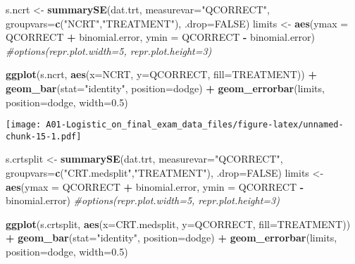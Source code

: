 \documentclass[]{article}
\newenvironment{Shaded}{\begin{snugshade}}{\end{snugshade}}
\newcommand{\KeywordTok}[1]{\textcolor[rgb]{0.13,0.29,0.53}{\textbf{#1}}}
\newcommand{\DataTypeTok}[1]{\textcolor[rgb]{0.13,0.29,0.53}{#1}}
\newcommand{\FloatTok}[1]{\textcolor[rgb]{0.00,0.00,0.81}{#1}}
\newcommand{\StringTok}[1]{\textcolor[rgb]{0.31,0.60,0.02}{#1}}
\newcommand{\CommentTok}[1]{\textcolor[rgb]{0.56,0.35,0.01}{\textit{#1}}}
\newcommand{\OtherTok}[1]{\textcolor[rgb]{0.56,0.35,0.01}{#1}}
\newcommand{\OperatorTok}[1]{\textcolor[rgb]{0.81,0.36,0.00}{\textbf{#1}}}
\newcommand{\NormalTok}[1]{#1}
\begin{document}
\begin{Shaded}
\begin{Highlighting}[]
\NormalTok{s.ncrt <-}\StringTok{ }\KeywordTok{summarySE}\NormalTok{(dat.trt, }\DataTypeTok{measurevar=}\StringTok{"QCORRECT"}\NormalTok{,}
                              \DataTypeTok{groupvars=}\KeywordTok{c}\NormalTok{(}\StringTok{"NCRT"}\NormalTok{,}\StringTok{"TREATMENT"}\NormalTok{), }\DataTypeTok{.drop=}\OtherTok{FALSE}\NormalTok{)}
\NormalTok{limits <-}\StringTok{ }\KeywordTok{aes}\NormalTok{(}\DataTypeTok{ymax =}\NormalTok{ QCORRECT }\OperatorTok{+}\StringTok{ }\NormalTok{binomial.error, }\DataTypeTok{ymin =}\NormalTok{ QCORRECT }\OperatorTok{-}\StringTok{ }\NormalTok{binomial.error)}
\CommentTok{#options(repr.plot.width=5, repr.plot.height=3)}

\KeywordTok{ggplot}\NormalTok{(s.ncrt, }\KeywordTok{aes}\NormalTok{(}\DataTypeTok{x=}\NormalTok{NCRT, }\DataTypeTok{y=}\NormalTok{QCORRECT, }\DataTypeTok{fill=}\NormalTok{TREATMENT)) }\OperatorTok{+}\StringTok{ }
\StringTok{    }\KeywordTok{geom_bar}\NormalTok{(}\DataTypeTok{stat=}\StringTok{"identity"}\NormalTok{, }\DataTypeTok{position=}\NormalTok{dodge) }\OperatorTok{+}\StringTok{ }
\StringTok{    }\KeywordTok{geom_errorbar}\NormalTok{(limits, }\DataTypeTok{position=}\NormalTok{dodge, }\DataTypeTok{width=}\FloatTok{0.5}\NormalTok{)}
\end{Highlighting}
\end{Shaded}

\texttt{[image: A01-Logistic\_on\_final\_exam\_data\_files/figure-latex/unnamed-chunk-15-1.pdf]}

\begin{Shaded}
\begin{Highlighting}[]
\NormalTok{s.crtsplit <-}\StringTok{ }\KeywordTok{summarySE}\NormalTok{(dat.trt, }\DataTypeTok{measurevar=}\StringTok{"QCORRECT"}\NormalTok{,}
                              \DataTypeTok{groupvars=}\KeywordTok{c}\NormalTok{(}\StringTok{"CRT.medsplit"}\NormalTok{,}\StringTok{"TREATMENT"}\NormalTok{), }\DataTypeTok{.drop=}\OtherTok{FALSE}\NormalTok{)}
\NormalTok{limits <-}\StringTok{ }\KeywordTok{aes}\NormalTok{(}\DataTypeTok{ymax =}\NormalTok{ QCORRECT }\OperatorTok{+}\StringTok{ }\NormalTok{binomial.error, }\DataTypeTok{ymin =}\NormalTok{ QCORRECT }\OperatorTok{-}\StringTok{ }\NormalTok{binomial.error)}
\CommentTok{#options(repr.plot.width=5, repr.plot.height=3)}

\KeywordTok{ggplot}\NormalTok{(s.crtsplit, }\KeywordTok{aes}\NormalTok{(}\DataTypeTok{x=}\NormalTok{CRT.medsplit, }\DataTypeTok{y=}\NormalTok{QCORRECT, }\DataTypeTok{fill=}\NormalTok{TREATMENT)) }\OperatorTok{+}\StringTok{ }
\StringTok{    }\KeywordTok{geom_bar}\NormalTok{(}\DataTypeTok{stat=}\StringTok{"identity"}\NormalTok{, }\DataTypeTok{position=}\NormalTok{dodge) }\OperatorTok{+}\StringTok{ }
\StringTok{    }\KeywordTok{geom_errorbar}\NormalTok{(limits, }\DataTypeTok{position=}\NormalTok{dodge, }\DataTypeTok{width=}\FloatTok{0.5}\NormalTok{)}
\end{Highlighting}
\end{Shaded}
\end{document}
